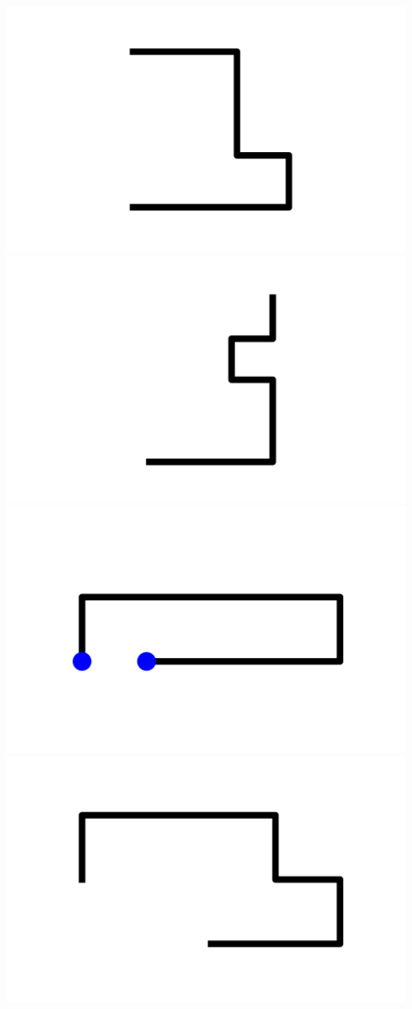 \documentclass[]{report}
\begin{document}
\includegraphics[scale=.1]{pictures/18/state_cluster_shapes_3.pdf} 
\includegraphics[scale=.1]{pictures/18/state_cluster_shapes_4.pdf} 
\includegraphics[scale=.1]{pictures/18/state_cluster_shapes_5.pdf} 
\includegraphics[scale=.1]{pictures/18/state_cluster_shapes_6.pdf} 
\end{document}
